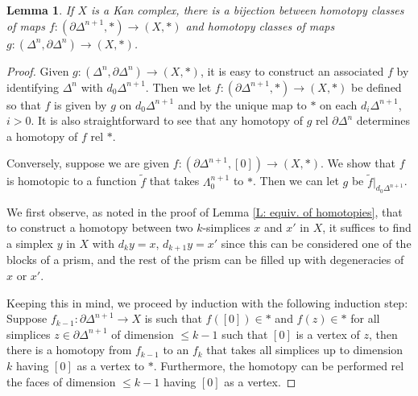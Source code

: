 \documentclass[12pt]{article}
\theoremstyle{plain}
\newtheorem{lemma}[theorem]{Lemma}
\theoremstyle{definition}
\newcommand{\td}[1]{\tilde{#1}}
\newcommand{\bd}{\partial}
\begin{document}
\begin{lemma}\label{L: lemma}
If $X$ is a Kan complex, there is a bijection between homotopy classes of maps $f\colon (\bd \Delta^{n+1},*)\to (X,*)$ and homotopy classes of maps $g\colon  (\Delta^n, \bd \Delta^n)\to (X,*)$.
\end{lemma}
\begin{proof}
Given $g\colon (\Delta^n, \bd \Delta^n)\to (X,*)$, it is easy to construct an associated $f$ by identifying $\Delta^n$ with $d_0\Delta^{n+1}$. Then we let $f\colon  (\bd \Delta^{n+1},*)\to (X,*)$ be defined so that $f$ is given by $g$ on $d_0\Delta^{n+1}$ and by the unique map to $*$ on each $d_i\Delta^{n+1}$, $i>0$. It is also straightforward to see that any homotopy of $g$ rel $\bd \Delta^n$ determines a homotopy of $f$ rel $*$. 

Conversely, suppose we are given $f\colon (\bd \Delta^{n+1},[0])\to (X,*)$. We show that $f$ is homotopic to a function $\td f$ that takes $\Lambda_0^{n+1}$ to $*$. Then we can let $g$ be $\td f|_{d_0\Delta^{n+1}}$. 


We first observe, as noted in the proof of Lemma \ref{L: equiv. of homotopies}, that to construct a homotopy between two  $k$-simplices $x$ and $x'$ in $X$, it suffices to find a simplex $y$ in $X$ with $d_ky=x$, $d_{k+1}y=x'$ since this can be considered one of the  blocks of a prism, and the rest of the prism can be filled up with degeneracies of $x$ or $x'$. 

Keeping this in mind, we proceed by induction with the following induction step: Suppose $f_{k-1}\colon \bd \Delta^{n+1}\to X$ is such that $f([0])\in *$ and $f(z)\in *$ for all simplices $z\in\bd \Delta^{n+1}$ of dimension $\leq k-1$ such that $[0]$ is a vertex of $z$, then there is a homotopy from $f_{k-1}$ to an $f_k$ that takes all simplices up to dimension $k$ having $[0]$ as a vertex to $*$. Furthermore, the homotopy can be performed rel the faces of dimension $\leq k-1$ having $[0]$ as a vertex.


\end{proof}
\end{document}
